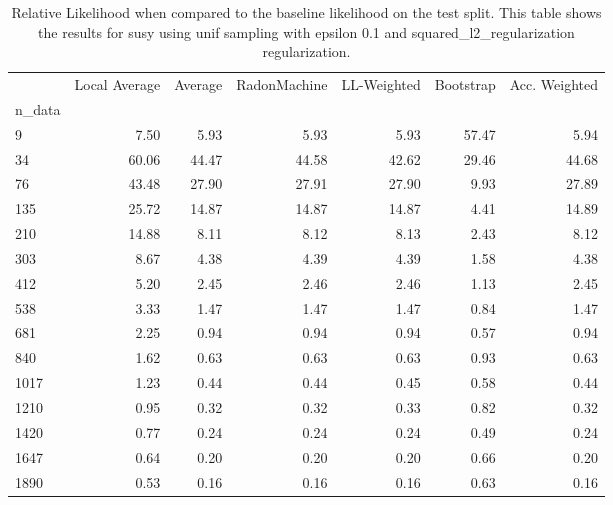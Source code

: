 \begin{table}
\centering
\caption{Relative Likelihood when compared to the baseline likelihood on the test split. This table shows the results for  susy using  unif sampling with epsilon  0.1 and  squared_l2_regularization regularization.}
\label{tab:6}
\begin{tabular}{lrrrrrr}
\toprule
{} &  Local Average &  Average &  RadonMachine &  LL-Weighted &  Bootstrap &  Acc. Weighted \\
n\_data &                &          &               &              &            &                \\
\midrule
9      &           7.50 &     5.93 &          5.93 &         5.93 &      57.47 &           5.94 \\
34     &          60.06 &    44.47 &         44.58 &        42.62 &      29.46 &          44.68 \\
76     &          43.48 &    27.90 &         27.91 &        27.90 &       9.93 &          27.89 \\
135    &          25.72 &    14.87 &         14.87 &        14.87 &       4.41 &          14.89 \\
210    &          14.88 &     8.11 &          8.12 &         8.13 &       2.43 &           8.12 \\
303    &           8.67 &     4.38 &          4.39 &         4.39 &       1.58 &           4.38 \\
412    &           5.20 &     2.45 &          2.46 &         2.46 &       1.13 &           2.45 \\
538    &           3.33 &     1.47 &          1.47 &         1.47 &       0.84 &           1.47 \\
681    &           2.25 &     0.94 &          0.94 &         0.94 &       0.57 &           0.94 \\
840    &           1.62 &     0.63 &          0.63 &         0.63 &       0.93 &           0.63 \\
1017   &           1.23 &     0.44 &          0.44 &         0.45 &       0.58 &           0.44 \\
1210   &           0.95 &     0.32 &          0.32 &         0.33 &       0.82 &           0.32 \\
1420   &           0.77 &     0.24 &          0.24 &         0.24 &       0.49 &           0.24 \\
1647   &           0.64 &     0.20 &          0.20 &         0.20 &       0.66 &           0.20 \\
1890   &           0.53 &     0.16 &          0.16 &         0.16 &       0.63 &           0.16 \\
\bottomrule
\end{tabular}
\end{table}
